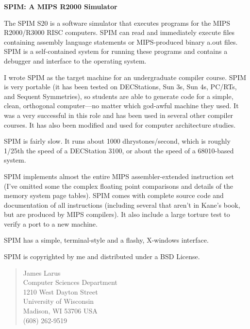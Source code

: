 


\begin{center}
  \LARGE\bf SPIM: A MIPS R2000 Simulator
\end{center}

The SPIM S20 is a software simulator that executes programs for the
MIPS R2000/R3000 RISC computers.  SPIM can read and immediately
execute files containing assembly language statements or MIPS-produced
binary a.out files.  SPIM is a self-contained system for running these
programs and contains a debugger and interface to the operating
system.

I wrote SPIM as the target machine for an undergraduate compiler
course. SPIM is very portable (it has been tested on DECStations, Sun
3s, Sun 4s, PC/RTs, and Sequent Symmetries), so students are able to
generate code for a simple, clean, orthogonal computer---no matter
which god-awful machine they used.  It was a very successful in this
role and has been used in several other compiler courses.  It has also
been modified and used for computer architecture studies.

SPIM is fairly slow.  It runs about 1000 dhrystones/second, which is
roughly 1/25th the speed of a DECStation 3100, or about the speed of a
68010-based system.

SPIM implements almost the entire MIPS assembler-extended instruction
set (I've omitted some the complex floating point comparisons and
details of the memory system page tables).  SPIM comes with complete
source code and documentation of all instructions (including several
that aren't in Kane's book, but are produced by MIPS compilers).  It
also include a large torture test to verify a port to a new machine.

SPIM has a simple, terminal-style and a flashy, X-windows interface.

SPIM is copyrighted by me and distributed under a BSD License.

\begin{quote}
James Larus\\
Computer Sciences Department\\
1210 West Dayton Street\\
University of Wisconsin\\
Madison, WI 53706 USA\\
(608) 262-9519
\end{quote}

